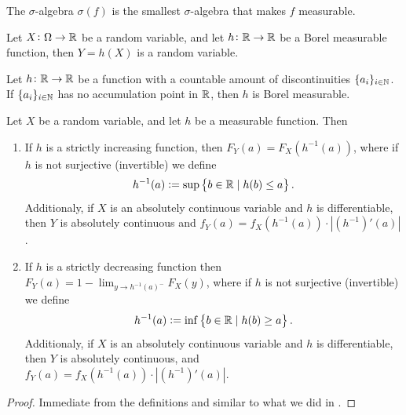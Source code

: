 \documentclass[11pt,a4paper]{article}
\begin{document}
\begin{remark}
  The $\sigma$-algebra $\sigma(f)$ is the smallest $\sigma$-algebra
  that makes $f$ measurable.
\end{remark}

\begin{proposition}
  \label{prop:function-of-rv}
  Let $X \colon \Omega \to \mathbb{R}$ be a random variable,
  and let $h \colon \mathbb{R} \to \mathbb{R}$
  be a Borel measurable function, then $Y = h(X)$ is a random variable.
\end{proposition}

\begin{theorem}
  Let $h \colon \mathbb{R} \to \mathbb{R}$ be a function with a countable amount of 
  discontinuities $\{a_i\}_{i \in \mathbb{N}}$. If $\{a_i\}_{i \in \mathbb{N}}$ has no
  accumulation point in $\mathbb{R}$, then $h$ is Borel measurable.
\end{theorem}

\begin{proposition}[Distribution function of $Y = h(X)$]
  \label{prop:distribution-of-Y}
  Let $X$ be a random variable, and let $h$ be a measurable function.
  Then
  \begin{enumerate}
    \item[(1)]
    If $h$ is a strictly increasing function,
    then $F_Y(a) = F_X(h^{-1}(a))$,
    where if $h$ is not surjective (invertible) we define
    \[
      h^{-1}(a) := \sup\left\{b \in \mathbb{R} \mid h(b) \le a\right\}.
    \]
    Additionaly, if $X$ is an absolutely continuous variable
    and $h$ is differentiable, 
    then $Y$ is absolutely continuous and 
    $f_Y(a) = f_X(h^{-1}(a)) \cdot |(h^{-1})'(a)|$.
    \item[(2)]
    If $h$ is a strictly decreasing function then 
    $F_Y(a) = 1 - \lim_{y \to h^{-1}(a)^-} F_X(y)$,
    where if $h$ is not surjective (invertible) we define
    \[ h^{-1}(a) := \inf\left\{b \in \mathbb{R} \mid h(b) \geq a\right\}. \]
    Additionaly, if $X$ is an absolutely continuous variable
    and $h$ is differentiable, then $Y$ is absolutely continuous,
    and $f_Y(a) = f_X(h^{-1}(a)) \cdot |(h^{-1})'(a)|$. 
  \end{enumerate}
\end{proposition}
\begin{proof}
  Immediate from the definitions and similar to
  what we did in .
\end{proof}
\end{document}
